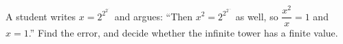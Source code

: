A student writes $x=2^{2^{2^{\cdot^{\cdot^{\cdot}}}}}$ and argues: ``Then $x^2=2^{2^{2^{\cdots}}}$ as well, so $\dfrac{x^2}{x}=1$ and $x=1$.'' Find the error, and decide whether the infinite tower has a finite value.
